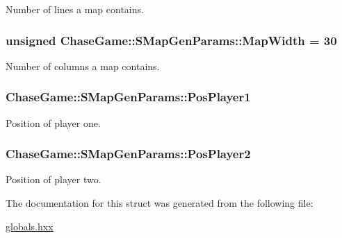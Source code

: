 Number of lines a map contains. 

\hypertarget{struct_chase_game_1_1_s_map_gen_params_a0897aeaa1a1a3a66697a6b441ca8c2de}{
\subsubsection[{Map\-Width}]{\setlength{\rightskip}{0pt plus 5cm}unsigned Chase\-Game\-::\-S\-Map\-Gen\-Params\-::\-Map\-Width = 30}}\label{struct_chase_game_1_1_s_map_gen_params_a0897aeaa1a1a3a66697a6b441ca8c2de}


Number of columns a map contains. 

\hypertarget{struct_chase_game_1_1_s_map_gen_params_a8db28a9ee45a200d67b20fc803645501}{
\subsubsection[{Pos\-Player1}]{ Chase\-Game\-::\-S\-Map\-Gen\-Params\-::\-Pos\-Player1}}\label{struct_chase_game_1_1_s_map_gen_params_a8db28a9ee45a200d67b20fc803645501}


Position of player one. 

\hypertarget{struct_chase_game_1_1_s_map_gen_params_afd0a0d4b22e228d547af88d38b6ae963}{
\subsubsection[{Pos\-Player2}]{ Chase\-Game\-::\-S\-Map\-Gen\-Params\-::\-Pos\-Player2}}\label{struct_chase_game_1_1_s_map_gen_params_afd0a0d4b22e228d547af88d38b6ae963}


Position of player two. 



The documentation for this struct was generated from the following file\-:\begin{DoxyCompactItemize}
\item 
\hyperlink{globals_8hxx}{globals.\-hxx}\end{DoxyCompactItemize}

